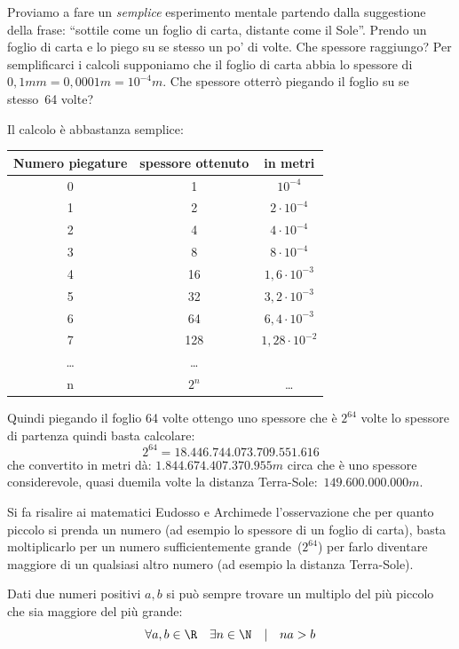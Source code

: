 Proviamo a fare un \emph{semplice} esperimento mentale partendo dalla 
suggestione della frase: ``sottile come un foglio di carta, distante come il 
Sole''. 
Prendo un foglio di carta e lo piego su se stesso un po' di volte. Che spessore 
raggiungo? 
Per semplificarci i calcoli supponiamo che il foglio di carta abbia 
lo spessore di \(0,1mm = 0,0001m = 10^{-4}m\). 
Che spessore otterrò piegando il foglio su se stesso~64 volte?

Il calcolo è abbastanza semplice:

\begin{center} 
\begin{tabular}{ccc} 
\toprule Numero piegature & spessore ottenuto & in metri\\ 
\midrule 0 & 1 & \(10^{-4}\)\\ 
1 & 2 & \(2 \cdot 10^{-4}\)\\ 
2 & 4 & \(4 \cdot 10^{-4}\)\\ 
3 & 8 & \(8 \cdot 10^{-4}\)\\ 
4 & 16 & \(1,6 \cdot 10^{-3}\)\\ 
5 & 32 & \(3,2 \cdot 10^{-3}\)\\ 
6 & 64 & \(6,4 \cdot 10^{-3}\)\\ 
7 & 128 & \(1,28 \cdot 10^{-2}\)\\ 
\ldots& \ldots\\ 
n & \(2^n\) & \ldots\\ 
\bottomrule 
\end{tabular} 
\end{center}

Quindi piegando il foglio 64 volte ottengo uno spessore che è \(2^{64}\) volte 
lo spessore di partenza quindi basta calcolare: 
\[2^{64} = 18.446.744.073.709.551.616\] 
che convertito in metri dà: 
\(1.844.674.407.370.955m\) circa che è uno spessore considerevole, quasi 
duemila 
volte la distanza Terra-Sole:~\(149.600.000.000m\).

Si fa risalire ai matematici Eudosso e Archimede l'osservazione che per quanto 
piccolo si prenda un numero (ad esempio lo spessore di un foglio di carta), 
basta moltiplicarlo per un numero sufficientemente grande~(\(2^{64}\)) per 
farlo diventare maggiore di un qualsiasi altro numero (ad esempio la distanza 
Terra-Sole).

\begin{postulato} Dati due numeri positivi \(a, b\) si può 
sempre trovare un multiplo del più piccolo che sia maggiore del più grande: 
\[\forall a, b \in \R \quad \exists n \in \N \quad | \quad na>b\] 
\end{postulato}

